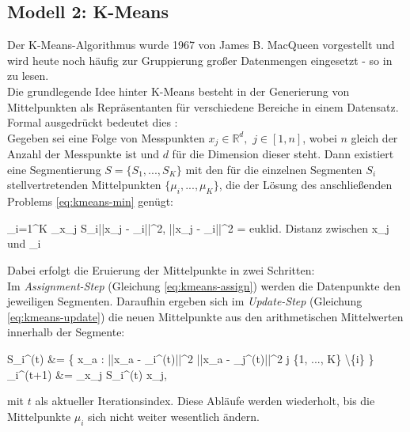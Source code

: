 		\subsection{Modell 2: K-Means}
		\label{sec:meth2}
		
			Der K-Means-Algorithmus wurde 1967 von James B. MacQueen \cite{macqueen-kmeans} vorgestellt und wird heute noch häufig zur Gruppierung großer Datenmengen eingesetzt - so in \cite{kmeans-info} zu lesen.\\
			Die grundlegende Idee hinter K-Means besteht in der Generierung von Mittelpunkten als Repräsentanten für verschiedene Bereiche in einem Datensatz. Formal ausgedrückt bedeutet dies \cite{mozdren-meth2}: \\
			Gegeben sei eine Folge von Messpunkten $x_{j} \in \mathbb{R}^{d},$ $j \in [1,n]$, wobei $n$ gleich der Anzahl der Messpunkte ist und $d$ für die Dimension dieser steht. Dann existiert eine Segmentierung $S = \{S_{1}, ..., S_{K}\}$ mit den für die einzelnen Segmenten $S_{i}$ stellvertretenden Mittelpunkten $\{\mu_{i}, ..., \mu_{K}\}$, die der Lösung des anschließenden Problems \ref{eq:kmeans-min} genügt:
			\begin{flalign}
				\centering
				 \sum_{i=1}^{K} \sum_{x_{j} \in S_{i}}\left|\left|x_{j} - \mu_{i}\right|\right|^{2}, \quad \left|\left|x_{j} - \mu_{i}\right|\right|^{2} = \textrm{euklid. Distanz zwischen } x_{j} \textrm{ und } \mu_{i}
				\label{eq:kmeans-min}
			\end{flalign}
			Dabei erfolgt die Eruierung der Mittelpunkte in zwei Schritten:\\
			Im \textit{Assignment-Step} (Gleichung \ref{eq:kmeans-assign}) werden die Datenpunkte den jeweiligen Segmenten. Daraufhin ergeben sich im \textit{Update-Step} (Gleichung \ref{eq:kmeans-update}) die neuen Mittelpunkte aus den arithmetischen Mittelwerten innerhalb der Segmente:
			\begin{flalign}
				S_{i}^{(t)} &= \left\{ x_{a} : \left|\left|x_{a} - \mu_{i}^{(t)}\right|\right|^{2} \leq \left|\left|x_{a} - \mu_{j^{(t)}}\right|\right|^{2} \forall j \in \{1, ..., K\} \textbackslash \{i\}  \right\} \label{eq:kmeans-assign}\\
				\mu_{i}^{(t+1)} &=  \sum_{x_{j} \in S_{i}^{(t)}} x_{j}, \label{eq:kmeans-update}
			\end{flalign}
			mit $t$ als aktueller Iterationsindex. Diese Abläufe werden wiederholt, bis die Mittelpunkte $\mu_{i}$ sich nicht weiter wesentlich ändern.